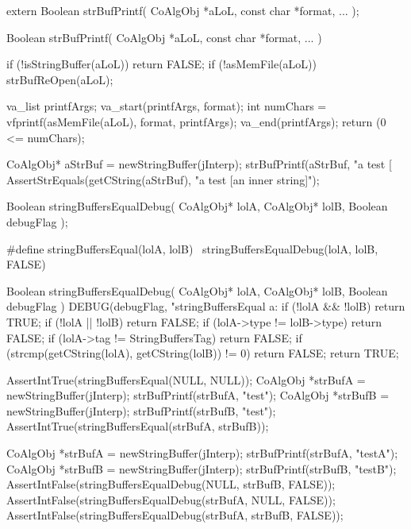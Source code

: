 \stopTestSuite

\startTestSuite[strBufPrintf]

\startCHeader
extern Boolean strBufPrintf(
  CoAlgObj   *aLoL,
  const char *format, 
  ...
);
\stopCHeader

\startCCode
Boolean strBufPrintf(
  CoAlgObj   *aLoL,
  const char *format,
  ...
) {
  if (!isStringBuffer(aLoL)) return FALSE;
  if (!asMemFile(aLoL)) strBufReOpen(aLoL);
  
  va_list printfArgs;
  va_start(printfArgs, format);
  int numChars = vfprintf(asMemFile(aLoL), format, printfArgs);
  va_end(printfArgs);
  return (0 <= numChars);
}
\stopCCode

\startCTest
  CoAlgObj* aStrBuf = newStringBuffer(jInterp);
  strBufPrintf(aStrBuf, "a test [%
  AssertStrEquals(getCString(aStrBuf), "a test [an inner string]");
\stopCTest
\stopTestCase
\stopTestSuite


\startCHeader
Boolean stringBuffersEqualDebug(
  CoAlgObj* lolA,
  CoAlgObj* lolB,
  Boolean debugFlag
);

#define stringBuffersEqual(lolA, lolB) \
  stringBuffersEqualDebug(lolA, lolB, FALSE)
\stopCHeader

\startCCode
Boolean stringBuffersEqualDebug(
  CoAlgObj* lolA,
  CoAlgObj* lolB,
  Boolean debugFlag
) {
  DEBUG(debugFlag, "stringBuffersEqual a:%
  if (!lolA && !lolB) return TRUE;
  if (!lolA || !lolB) return FALSE;
  if (lolA->type != lolB->type) return FALSE;
  if (lolA->tag != StringBuffersTag) return FALSE;
  if (strcmp(getCString(lolA), getCString(lolB)) != 0) return FALSE;
  return TRUE;
}
\stopCCode


\startCTest
  AssertIntTrue(stringBuffersEqual(NULL, NULL));
  CoAlgObj *strBufA = newStringBuffer(jInterp);
  strBufPrintf(strBufA, "test");
  CoAlgObj *strBufB = newStringBuffer(jInterp);
  strBufPrintf(strBufB, "test");
  AssertIntTrue(stringBuffersEqual(strBufA, strBufB));
\stopCTest
\stopTestCase


\startCTest
  CoAlgObj *strBufA = newStringBuffer(jInterp);
  strBufPrintf(strBufA, "testA");
  CoAlgObj *strBufB = newStringBuffer(jInterp);
  strBufPrintf(strBufB, "testB");
  AssertIntFalse(stringBuffersEqualDebug(NULL, strBufB, FALSE));
  AssertIntFalse(stringBuffersEqualDebug(strBufA, NULL, FALSE));
  AssertIntFalse(stringBuffersEqualDebug(strBufA, strBufB, FALSE));
\stopCTest
\stopTestCase
\stopTestSuite

